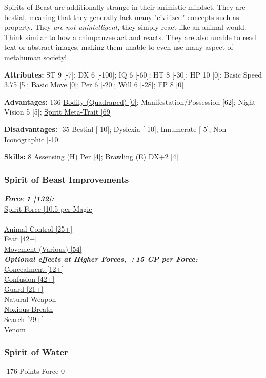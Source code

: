 \begin{multicols*}{3}
	Spirits of Beast are additionally strange in their animistic mindset. They are bestial, meaning that they generally lack many "civilized" concepts such as property. They \textit{are not unintelligent,} they simply react like an animal would. Think similar to how a chimpanzee act and reacts. They are also unable to read text or abstract images, making them unable to even use many aspect of metahuman society!
	
	\textbf{Attributes:}
	ST 9 [-7]; DX 6 [-100]; IQ 6 [-60]; HT 8 [-30]; HP 10 [0]; Basic Speed 3.75 [5]; Basic Move  [0]; Per 6 [-20]; Will 6 [-28]; FP 8 [0]
	
	\textbf{Advantages:} 136
	\hyperref[elemental]{Bodily (Quadraped) [0]}; Manifestation/Possession [62]; Night Vision 5 [5]; \hyperref[spirit_meta_trait]{Spirit Meta-Trait [69]}
	
	\textbf{Disadvantages:} -35
	Bestial [-10]; Dyslexia [-10]; Innumerate [-5]; Non Iconographic [-10]
	
	\textbf{Skills:} 8
	Assensing (H) Per [4]; Brawling (E) DX+2 [4]
	
	\subsubsection*{Spirit of Beast Improvements}
	
	\textbf{\textit{Force 1 [132]:\\}}
	\hyperref[spirit_force]{Spirit Force [10.5 per Magic]}\\\\
	\hyperref[animal_control]{Animal Control [25+]}\\
	\hyperref[fear]{Fear [42+]}\\
	\hyperref[movement]{Movement (Various) [54]}\\
	
	\textbf{\textit{Optional effects at Higher Forces, +15 CP per Force:\\}}
	\hyperref[concealment]{Concealment [12+]}\\
	\hyperref[confusion]{Confusion [42+]}\\
	\hyperref[guard]{Guard [21+]}\\
	\hyperref[natural_weapon]{Natural Weapon}\\
	\hyperref[noxious_breath]{Noxious Breath}\\
	\hyperref[search]{Search [29+]}\\
	\hyperref[venom]{Venom}\\
	
	\subsubsection{Spirit of Water}
	\begin{flushright}
		-176 Points Force 0
	\end{flushright}
	

\end{multicols*}
